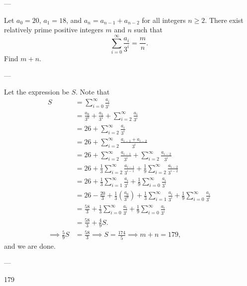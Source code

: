 
---

Let $a_0=20$, $a_1=18$, and $a_n=a_{n-1}+a_{n-2}$ for all integers $n\ge 2$. There exist relatively prime positive integers $m$ and $n$ such that \[\sum_{i=0}^\infty \frac{a_i}{3^i}=\frac mn.\]
Find $m+n$. 

---

Let the expression be $S$. Note that
\begin{align*}
S&=\sum_{i=0}^\infty \frac{a_i}{3^i} \\
&=\frac{a_0}{3^0}+\frac{a_1}{3^1}+\sum_{i=2}^\infty \frac{a_i}{3^i} \\
&=26+\sum_{i=2}^\infty \frac{a_i}{3^i} \\
&=26+\sum_{i=2}^\infty \frac{a_{i-1}+a_{i-2}}{3^i} \\
&=26+\sum_{i=2}^\infty \frac{a_{i-1}}{3^i}+\sum_{i=2}^\infty \frac{a_{i-2}}{3^i} \\
&=26+\frac{1}{3}\sum_{i=2}^\infty \frac{a_{i-1}}{3^{i-1}}+\frac{1}{9}\sum_{i=2}^\infty \frac{a_{i-2}}{3^{i-2}} \\
&=26+\frac{1}{3}\sum_{i=1}^\infty \frac{a_i}{3^i}+\frac{1}{9}\sum_{i=0}^\infty \frac{a_i}{3^i} \\
&=26-\frac{20}{3}+\frac{1}{3}\left(\frac{a_0}{3^0}\right)+\frac{1}{3}\sum_{i=1}^\infty \frac{a_i}{3^i}+\frac{1}{9}\sum_{i=0}^\infty \frac{a_i}{3^i} \\
&=\frac{58}{3}+\frac{1}{3}\sum_{i=0}^\infty \frac{a_i}{3^i}+\frac{1}{9}\sum_{i=0}^\infty \frac{a_i}{3^i} \\
&=\frac{58}{3}+\frac{4}{9}S. \\
\implies \frac{5}{9}S&=\frac{58}{3}\implies S=\frac{174}{5}\implies m+n=179,
\end{align*}
and we are done.

---

179
